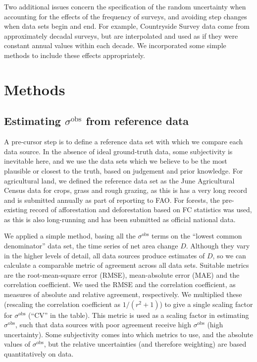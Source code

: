 \documentclass[
]{book}
\begin{document}
Two additional issues concern the specification of the random uncertainty when accounting for the effects of the frequency of surveys, and avoiding step changes when data sets begin and end. For example, Countryside Survey data come from approximately decadal surveys, but are interpolated and used as if they were constant annual values within each decade. We incorporated some simple methods to include these effects appropriately.

\hypertarget{methods}{%
\section{Methods}\label{methods}}

\hypertarget{estimating-sigmamathrmobs-from-reference-data}{%
\subsection{\texorpdfstring{Estimating \(\sigma^\mathrm{obs}\) from reference data}{Estimating \textbackslash sigma\^{}\textbackslash mathrm\{obs\} from reference data}}\label{estimating-sigmamathrmobs-from-reference-data}}

A pre-cursor step is to define a reference data set with which we compare each data source. In the absence of ideal ground-truth data, some subjectivity is inevitable here, and we use the data sets which we believe to be the most plausible or closest to the truth, based on judgement and prior knowledge. For agricultural land, we defined the reference data set as the June Agricultural Census data for crops, grass and rough grazing, as this is has a very long record and is submitted annually as part of reporting to FAO.
For forests, the pre-existing record of afforestation and deforestation based on FC statistics was used, as this is also long-running and has been submitted as official national data.

We applied a simple method, basing all the \(\sigma^\mathrm{obs}\) terms on the ``lowest common denominator'' data set, the time series of net area change \(D\). Although they vary in the higher levels of detail, all data sources produce estimates of \(D\), so we can calculate a comparable metric of agreement across all data sets. Suitable metrics are the root-mean-square error (RMSE), mean-absolute error (MAE) and the correlation coefficient.
We used the RMSE and the correlation coefficient, as measures of absolute and relative agreement, respectively.
We multiplied these (rescaling the correlation coefficient as \(1/(r^2+1)\)) to give a single scaling factor for \(\sigma^\mathrm{obs}\) (``CV'' in the table).
This metric is used as a scaling factor in estimating \(\sigma^\mathrm{obs}\), such that data sources with poor agreement receive high \(\sigma^\mathrm{obs}\) (high uncertainty). Some subjectivity comes into which metrics to use, and the absolute values of \(\sigma^\mathrm{obs}\), but the relative uncertainties (and therefore weighting) are based quantitatively on data.
\end{document}
